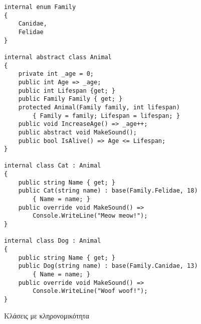 \begin{listing}[htbp]
\begin{verbatim}
internal enum Family
{
    Canidae,
    Felidae
}

internal abstract class Animal
{
    private int _age = 0;
    public int Age => _age;
    public int Lifespan {get; }
    public Family Family { get; }
    protected Animal(Family family, int lifespan) 
        { Family = family; Lifespan = lifespan; }
    public void IncreaseAge() => _age++;
    public abstract void MakeSound();
    public bool IsAlive() => Age <= Lifespan;
}

internal class Cat : Animal
{
    public string Name { get; }
    public Cat(string name) : base(Family.Felidae, 18)
        { Name = name; }
    public override void MakeSound() => 
        Console.WriteLine("Meow meow!");
}

internal class Dog : Animal
{
    public string Name { get; }
    public Dog(string name) : base(Family.Canidae, 13)
        { Name = name; }
    public override void MakeSound() => 
        Console.WriteLine("Woof woof!");
}
\end{verbatim}
\caption{Κλάσεις με κληρονομικότητα}
\label{inheritanceClasses}
\end{listing}